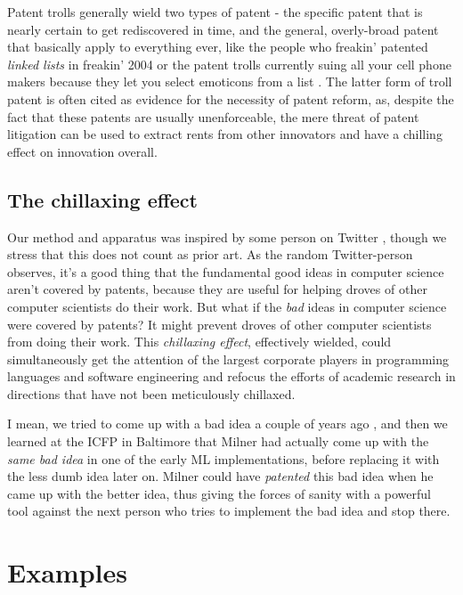 \documentclass[acmtocl]%
{boviktrans}
\begin{document}
Patent trolls generally wield two types of patent - the specific
patent that is nearly certain to get rediscovered in time, and the
general, overly-broad patent that basically apply to everything ever,
like the people who freakin' patented {\it linked lists} in freakin'
2004 \cite{want} or the patent trolls currently suing all your cell
phone makers because they let you select emoticons from a list
\cite{smile}.  The latter form of troll patent is often cited as
evidence for the necessity of patent reform, as, despite the fact that
these patents are usually unenforceable, the mere threat of patent
litigation can be used to extract rents from other innovators and have
a chilling effect on innovation overall.

\subsection{The chillaxing effect}

Our method and apparatus was inspired by some person on Twitter
\cite{tweet}, though we stress that this does not count as prior art.
As the random Twitter-person observes, it's a good thing that the
fundamental good ideas in computer science aren't covered by patents,
because they are useful for helping droves of other computer
scientists do their work.  But what if the {\it bad} ideas in computer
science were covered by patents? It might prevent droves of other
computer scientists from doing their work. This {\it chillaxing
  effect}, effectively wielded, could simultaneously get the attention
of the largest corporate players in programming languages and software
engineering and refocus the efforts of academic research in directions
that have not been meticulously chillaxed.

I mean, we tried to come up with a bad idea a couple of years ago
\cite{sigbovik10}, and then we learned at the ICFP in Baltimore that
Milner had actually come up with the {\it same bad idea} in one of the
early ML implementations, before replacing it with the less dumb idea
later on. Milner could have {\it patented} this bad idea when he came
up with the better idea, thus giving the forces of sanity with a
powerful tool against the next person who tries to implement the bad
idea and stop there.

\section{Examples}
\end{document}
